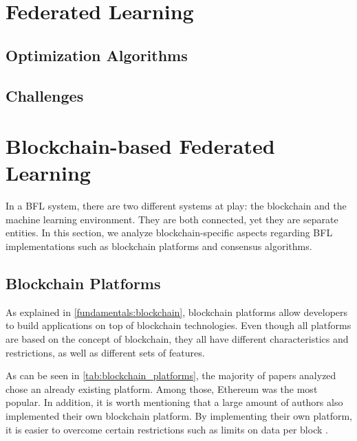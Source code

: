 
\section{Federated Learning}

\subsection{Optimization Algorithms}

\subsection{Challenges}


\section{Blockchain-based Federated Learning}

In a BFL system, there are two different systems at play: the blockchain and the machine learning environment. They are both connected, yet they are separate entities. In this section, we analyze blockchain-specific aspects regarding BFL implementations such as blockchain platforms and consensus algorithms.

\subsection{Blockchain Platforms}\label{related_work:blockchain_platforms}

As explained in \autoref{fundamentals:blockchain}, blockchain platforms allow developers to build applications on top of blockchain technologies. Even though all platforms are based on the concept of blockchain, they all have different characteristics and restrictions, as well as different sets of features.

As can be seen in \autoref{tab:blockchain_platforms}, the majority of papers analyzed chose an already existing platform. Among those, Ethereum was the most popular. In addition, it is worth mentioning that a large amount of authors also implemented their own blockchain platform. By implementing their own platform, it is easier to overcome certain restrictions such as limits on data per block \cite{8733825, 9524833}.



